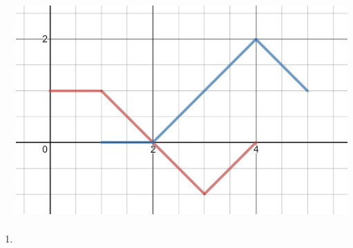 \documentclass{ximera}
\begin{document}
\begin{problem}
\begin{enumerate}
  \item \begin{image}
   \includegraphics[height=4in]{160H3pic3.jpg}
 \end{image}
 \begin{multipleChoice}  
  \end{multipleChoice}
\end{enumerate}
\end{problem}
\end{document}

